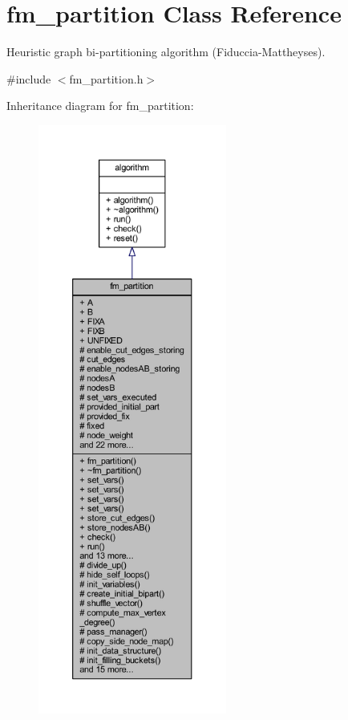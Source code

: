 \hypertarget{classfm__partition}{}\section{fm\+\_\+partition Class Reference}
\label{classfm__partition}


Heuristic graph bi-\/partitioning algorithm (Fiduccia-\/\+Mattheyses).  




{\ttfamily \#include $<$fm\+\_\+partition.\+h$>$}



Inheritance diagram for fm\+\_\+partition\+:\nopagebreak
\begin{figure}[H]
\begin{center}
\leavevmode
\includegraphics[height=550pt]{classfm__partition__inherit__graph}
\end{center}
\end{figure}


